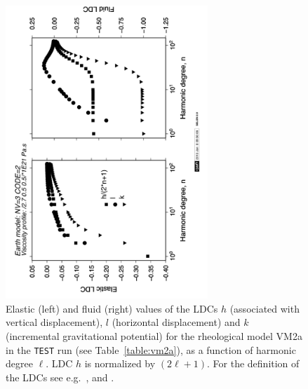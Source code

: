 \documentclass[11pt,fleqn,a4paper,titlepage]{article}
\begin{document}
\begin{figure}[h]
\begin{center}
\includegraphics[width=0.68\textwidth, angle=-90]{./Figures/ela-flu.png}
\caption[Load---deformation coefficients (LDCs)]{\small{Elastic (left) and fluid (right) values of the LDCs 
$h$ (associated with vertical displacement), $l$ (horizontal displacement) and $k$ (incremental gravitational potential) for the rheological model VM2a in the \texttt{TEST} run (see Table~\ref{table:vm2a}), as a function of harmonic degree $\ell$. LDC $h$ is normalized by $(2\ell +1)$. For the definition of the LDCs
see e.g.~\citet{Spada-2003a}, and \citet{Spada_etal_2011}}.}
\label{fig:ldcs}
\end{center}
\end{figure}
\newpage
\end{document}
